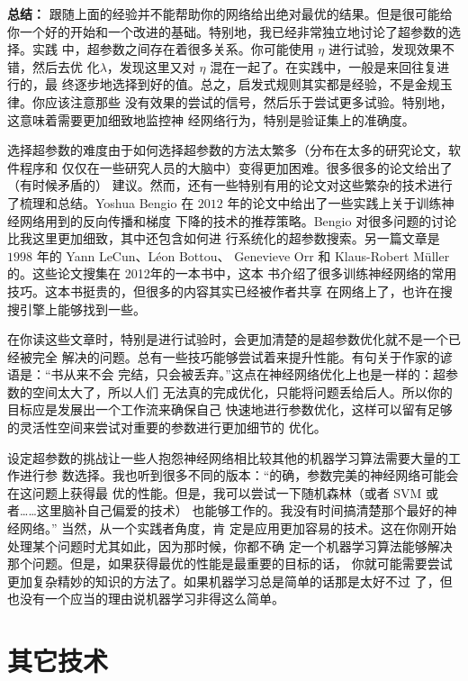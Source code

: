 \textbf{总结：} 跟随上面的经验并不能帮助你的网络给出绝对最优的结果。但是很可能给
你一个好的开始和一个改进的基础。特别地，我已经非常独立地讨论了超参数的选择。实践
中，超参数之间存在着很多关系。你可能使用 $\eta$ 进行试验，发现效果不错，然后去优
化$\lambda$，发现这里又对 $\eta$ 混在一起了。在实践中，一般是来回往复进行的，最
终逐步地选择到好的值。总之，启发式规则其实都是经验，不是金规玉律。你应该注意那些
没有效果的尝试的信号，然后乐于尝试更多试验。特别地，这意味着需要更加细致地监控神
经网络行为，特别是验证集上的准确度。

选择超参数的难度由于如何选择超参数的方法太繁多（分布在太多的研究论文，软件程序和
  仅仅在一些研究人员的大脑中）变得更加困难。很多很多的论文给出了（有时候矛盾的）
建议。然而，还有一些特别有用的论文对这些繁杂的技术进行了梳理和总结。Yoshua
Bengio 在 $2012$ 年的论文中给出了一些实践上关于训练神经网络用到的反向传播和梯度
下降的技术的推荐策略。Bengio 对很多问题的讨论比我这里更加细致，其中还包含如何进
行系统化的超参数搜索。另一篇文章是 $1998$ 年的 Yann LeCun、Léon Bottou、
Genevieve Orr 和 Klaus-Robert Müller 的。这些论文搜集在 2012年的一本书中，这本
书介绍了很多训练神经网络的常用技巧。这本书挺贵的，但很多的内容其实已经被作者共享
在网络上了，也许在搜搜引擎上能够找到一些。

在你读这些文章时，特别是进行试验时，会更加清楚的是超参数优化就不是一个已经被完全
解决的问题。总有一些技巧能够尝试着来提升性能。有句关于作家的谚语是：“书从来不会
完结，只会被丢弃。”这点在神经网络优化上也是一样的：超参数的空间太大了，所以人们
无法真的完成优化，只能将问题丢给后人。所以你的目标应是发展出一个工作流来确保自己
快速地进行参数优化，这样可以留有足够的灵活性空间来尝试对重要的参数进行更加细节的
优化。

设定超参数的挑战让一些人抱怨神经网络相比较其他的机器学习算法需要大量的工作进行参
数选择。我也听到很多不同的版本：“的确，参数完美的神经网络可能会在这问题上获得最
优的性能。但是，我可以尝试一下随机森林（或者 SVM 或者……这里脑补自己偏爱的技术）
也能够工作的。我没有时间搞清楚那个最好的神经网络。” 当然，从一个实践者角度，肯
定是应用更加容易的技术。这在你刚开始处理某个问题时尤其如此，因为那时候，你都不确
定一个机器学习算法能够解决那个问题。但是，如果获得最优的性能是最重要的目标的话，
你就可能需要尝试更加复杂精妙的知识的方法了。如果机器学习总是简单的话那是太好不过
了，但也没有一个应当的理由说机器学习非得这么简单。

\section{其它技术}
\label{sec:other_techniques}

